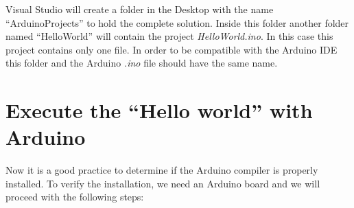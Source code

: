 Visual Studio will create a folder in the Desktop with the name ``ArduinoProjects'' to hold the complete solution. Inside this folder another folder named ``HelloWorld'' will contain the project \textit{HelloWorld.ino}. In this case this project contains only one file. In order to be compatible with the Arduino IDE this folder and the Arduino \textit{.ino} file should have the same name. 

\vspace{0.5cm}
    \section{Execute the ``Hello world'' with Arduino}

Now it is a good practice to determine if the Arduino compiler is properly installed. To verify the installation, we need an Arduino board and we will proceed with the following steps: 

